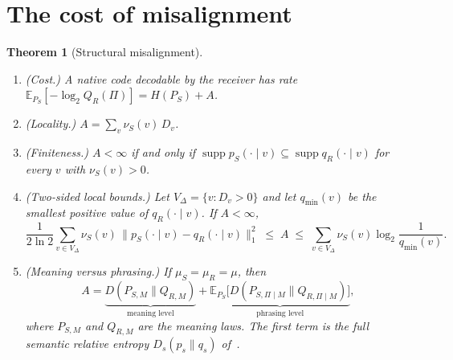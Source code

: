 \documentclass[11pt]{article}
\newtheorem{theorem}{Theorem}
\theoremstyle{definition}
\theoremstyle{remark}
\newcommand{\E}{\mathbb{E}}
\newcommand{\D}{D}
\newcommand{\supp}{\operatorname{supp}}
\begin{document}
\section{The cost of misalignment}

\begin{theorem}[Structural misalignment]\label{thm:A}
\begin{enumerate}
\item[(a)] \emph{(Cost.)} A native code decodable by the receiver has rate $\E_{P_S}[-\log_2Q_R(\Pi)]=H(P_S)+A$.
\item[(b)] \emph{(Locality.)} $A=\sum_{v}\nu_S(v)\,D_v$.
\item[(c)] \emph{(Finiteness.)} $A<\infty$ if and only if $\supp p_S(\cdot\mid v)\subseteq\supp q_R(\cdot\mid v)$ for every $v$ with $\nu_S(v)>0$.
\item[(d)] \emph{(Two-sided local bounds.)} Let $V_\Delta=\{v:D_v>0\}$ and let $q_{\min}(v)$ be the smallest positive value of $q_R(\cdot\mid v)$. If $A<\infty$,
\[
\frac{1}{2\ln 2}\sum_{v\in V_\Delta}\nu_S(v)\,\bigl\|p_S(\cdot\mid v)-q_R(\cdot\mid v)\bigr\|_1^2\;\le\;A\;\le\;\sum_{v\in V_\Delta}\nu_S(v)\log_2\frac{1}{q_{\min}(v)}.
\]
\item[(e)] \emph{(Meaning versus phrasing.)} If $\mu_S=\mu_R=\mu$, then
\[
A=\underbrace{\D(P_{S,M}\|Q_{R,M})}_{\text{meaning level}}+\underbrace{\E_{P_S}\bigl[\D(P_{S,\Pi\mid M}\|Q_{R,\Pi\mid M})\bigr]}_{\text{phrasing level}},
\]
where $P_{S,M}$ and $Q_{R,M}$ are the meaning laws. The first term is the full semantic relative entropy $D_s(p_s\|q_s)$ of~\cite[Def.~4.1]{niu2025}.
\end{enumerate}
\end{theorem}
\end{document}
